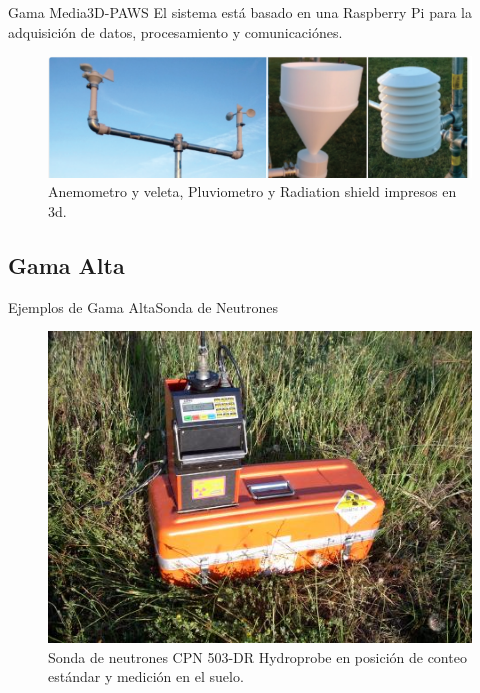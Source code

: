 \documentclass[]{beamer}
\begin{document}
\begin{frame}{Gama Media}{3D-PAWS}
El sistema está basado en una Raspberry Pi para la adquisición de datos, procesamiento y comunicaciónes.

\begin{figure}
  \includegraphics[height=0.4\textheight]{Docs/3dpaws2}
  \caption{Anemometro y veleta, Pluviometro y Radiation shield impresos en 3d.}
  \label{}
\end{figure}
\end{frame}

\subsection{Gama Alta}
\begin{frame}{Ejemplos de Gama Alta}{Sonda de Neutrones}
  \begin{figure}
    \includegraphics[height=0.7\textheight]{Docs/sondaneutrones}
    \caption{Sonda de neutrones CPN 503-DR Hydroprobe en posición de conteo estándar y medición en el suelo. }
    \label{}
  \end{figure}

\end{frame}
\end{document}

